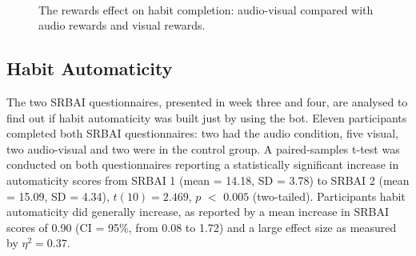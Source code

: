 \documentclass{scaffold/sigchi}
\begin{document}
\begin{figure}
  \centering
  \caption{The rewards effect on habit completion: audio-visual compared with audio rewards and visual rewards.}~\label{fig:m1_h2}
\end{figure}

\subsection{Habit Automaticity}
The two SRBAI questionnaires, presented in week three and four, are analysed to find out if habit automaticity was built just by using the bot. Eleven participants completed both SRBAI questionnaires: two had the audio condition, five visual, two audio-visual and two were in the control group. A paired-samples t-test was conducted on both questionnaires reporting a statistically significant increase in automaticity scores from SRBAI 1 (mean = 14.18, SD = 3.78) to SRBAI 2 (mean = 15.09, SD = 4.34), $t(10) = 2.469$, $p$ $<$ $0.005$ (two-tailed). Participants habit automaticity did generally increase, as reported by a mean increase in SRBAI scores of 0.90 (CI = 95\%, from 0.08 to 1.72) and a large effect size as measured by $\eta^{2} = 0.37$.
\end{document}
